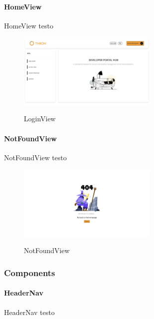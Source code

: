 \paragraph{HomeView}\label{par:home-view}

HomeView testo

\begin{figure}[ht]
  \centering
  \includegraphics[width=0.6\textwidth, alt={Pagina principale dell'applicazione}]{images/frontend/HomeView.jpg}
  \caption{LoginView}\label{fig:home-view}
\end{figure}

\paragraph{NotFoundView}\label{par:not-found-view}
NotFoundView testo

\begin{figure}[ht]
  \centering
  \includegraphics[width=0.6\textwidth, alt={Pagina di errore 404}]{images/frontend/NotFoundView.jpg}
  \caption{NotFoundView}\label{fig:not-found-view}
\end{figure}

\subsubsection{Components}\label{subsubsec:components}

\paragraph{HeaderNav}\label{par:header-nav}

HeaderNav testo

